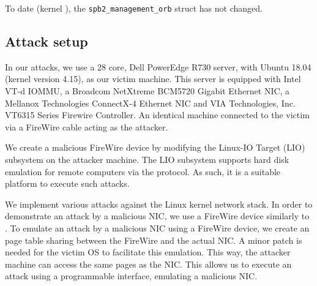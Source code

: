 To date (kernel \latestversion), the \texttt{spb2\_management\_orb} struct has not changed.


\subsection{Attack setup}
In our attacks, we use a 28 core, Dell PowerEdge R730 server, with Ubuntu 18.04 (kernel version 4.15), as our victim machine. This server is equipped with Intel VT-d IOMMU, a Broadcom NetXtreme BCM5720 Gigabit Ethernet NIC, a Mellanox Technologies ConnectX-4 Ethernet NIC and VIA Technologies, Inc. VT6315 Series Firewire Controller. An identical machine connected to the victim via a FireWire cable acting as the attacker. 

We create a malicious FireWire device by modifying the Linux-IO Target (LIO) subsystem on the attacker machine. The LIO subsystem supports hard disk emulation for remote computers via the \spb{} protocol. As such, it is a suitable platform to execute such attacks. 

We implement various attacks against the Linux kernel network stack. In order to demonstrate an attack by a malicious NIC, we use a FireWire device similarly to \cite{SLND10}. To emulate an attack by a malicious NIC using a FireWire device, we create an \iova{} page table sharing between the FireWire and the actual NIC. A minor patch is needed for the victim OS to facilitate this emulation. This way, the attacker machine can access the same pages as the NIC. This allows us to execute an attack using a programmable interface, emulating a malicious NIC.
